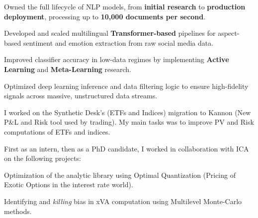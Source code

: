\documentclass[]{deedy-resume-openfont}
\begin{document}
\sectionsep

\vspace{0.1cm}
\begin{tightemize}
    \item[\diamond] Owned the full lifecycle of NLP models, from \textbf{initial research} to \textbf{production deployment}, processing up to \textbf{10,000 documents per second}.
    \item[\diamond] Developed and scaled multilingual \textbf{Transformer-based} pipelines for aspect-based sentiment and emotion extraction from raw social media data.
    \item[\diamond] Improved classifier accuracy in low-data regimes by implementing \textbf{Active Learning} and \textbf{Meta-Learning} research.
    \item[\diamond] Optimized deep learning inference and data filtering logic to ensure high-fidelity signals across massive, unstructured data streams.
\end{tightemize}

\sectionsep

I worked on the Synthetic Desk's (ETFs and Indices) migration to Kannon (New P$\&$L and Risk tool used by trading). My main tasks was to improve PV and Risk computations of ETFs and indices.

\sectionsep


First as an intern, then as a PhD candidate, I worked in collaboration with ICA on the following projects:
\vspace{0.1cm}
\begin{tightemize}
	\item[\diamond] Optimization of the analytic library using Optimal Quantization (Pricing of Exotic Options in the interest rate world).
	\item[\diamond] Identifying and \textit{killing} bias in xVA computation using Multilevel Monte-Carlo methods.
\end{tightemize}


\end{document}
